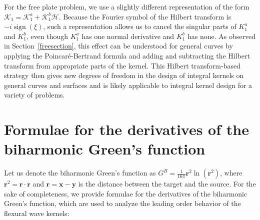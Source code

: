 \documentclass[preprint,12pt,3p]{elsarticle}
\DeclareMathOperator{\sign}{sign}
\begin{document}
For the free plate problem, we use a slightly different representation of the form
$\mathcal{K}_1 = \mathcal{K}_1^a + \mathcal{K}_1^b \mathcal{H}$. Because the Fourier
symbol of the Hilbert transform is $-i\sign(\xi)$, such a representation allows us to
cancel the singular parts of $K_1^a$ and $K_1^b$, even though $K_1^a$ has one normal
derivative and $K_1^b$ has none. As observed in Section~\ref{freesection}, this
effect can be understood for general curves by applying the Poincar\'{e}-Bertrand formula
and adding and subtracting the Hilbert transform from appropriate parts of the kernel. 
This Hilbert transform-based strategy then gives new degrees of freedom
in the design of integral kernels on general curves and surfaces and is likely applicable to 
integral kernel design for a variety of problems. 


\section{Formulae for the derivatives of the biharmonic Green's function} 
Let us denote the biharmonic Green's function as $G^{B} = \frac{1}{16\pi} \pmb{r}^2 \ln(\pmb{r}^2) $, where $\pmb{r}^2 = \pmb{r}\cdot \pmb{r}$ and $\pmb{r} = \mathbf{x}-\mathbf{y}$ is the distance between the target and the source. For the sake of completeness, we provide formulae for the derivatives of the biharmonic Green's function, which are used to analyze the leading order behavior of the flexural wave kernels: 
\end{document}
